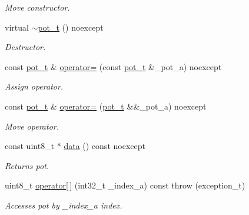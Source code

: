 \begin{DoxyCompactItemize}
\begin{DoxyCompactList}\small\item\em Move constructor. \end{DoxyCompactList}\item 
\hypertarget{class_n_h_1_1_protocols_1_1_raw_1_1pot__t_a6dff7ad396d312de62f1a4568b4ec51c}{virtual \hyperlink{class_n_h_1_1_protocols_1_1_raw_1_1pot__t_a6dff7ad396d312de62f1a4568b4ec51c}{$\sim$pot\+\_\+t} () noexcept}\label{class_n_h_1_1_protocols_1_1_raw_1_1pot__t_a6dff7ad396d312de62f1a4568b4ec51c}

\begin{DoxyCompactList}\small\item\em Destructor. \end{DoxyCompactList}\item 
const \hyperlink{class_n_h_1_1_protocols_1_1_raw_1_1pot__t}{pot\+\_\+t} \& \hyperlink{class_n_h_1_1_protocols_1_1_raw_1_1pot__t_a65d782c7d72c93a090f3ae24215fb1bb}{operator=} (const \hyperlink{class_n_h_1_1_protocols_1_1_raw_1_1pot__t}{pot\+\_\+t} \&\+\_\+pot\+\_\+a) noexcept
\begin{DoxyCompactList}\small\item\em Assign operator. \end{DoxyCompactList}\item 
const \hyperlink{class_n_h_1_1_protocols_1_1_raw_1_1pot__t}{pot\+\_\+t} \& \hyperlink{class_n_h_1_1_protocols_1_1_raw_1_1pot__t_a17dfa779637feb4361afd41379ee29a4}{operator=} (\hyperlink{class_n_h_1_1_protocols_1_1_raw_1_1pot__t}{pot\+\_\+t} \&\&\+\_\+pot\+\_\+a) noexcept
\begin{DoxyCompactList}\small\item\em Move operator. \end{DoxyCompactList}\item 
const uint8\+\_\+t $\ast$ \hyperlink{class_n_h_1_1_protocols_1_1_raw_1_1pot__t_af67504820aeff86c904925983d4644a1}{data} () const noexcept
\begin{DoxyCompactList}\small\item\em Returns pot. \end{DoxyCompactList}\item 
uint8\+\_\+t \hyperlink{class_n_h_1_1_protocols_1_1_raw_1_1pot__t_aebfc8267a6c20674a4cf7a2cd00081be}{operator\mbox{[}$\,$\mbox{]}} (int32\+\_\+t \+\_\+index\+\_\+a) const   throw (exception\+\_\+t)
\begin{DoxyCompactList}\small\item\em Accesses pot by {\ttfamily \+\_\+index\+\_\+a} index. \end{DoxyCompactList}\item 

\end{DoxyCompactItemize}
